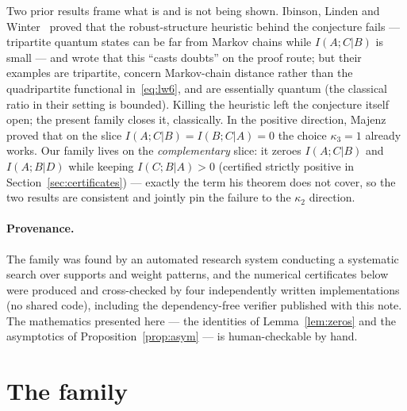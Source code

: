\documentclass[11pt]{article}
\theoremstyle{remark}
\newcommand{\I}{\mathrel{;}}
\begin{document}
Two prior results frame what is and is not being shown. Ibinson, Linden and
Winter~\cite{ILW2008} proved that the robust-structure heuristic behind the conjecture
fails --- tripartite quantum states can be far from Markov chains while $I(A\I C|B)$ is
small --- and wrote that this ``casts doubts'' on the proof route; but their examples are
tripartite, concern Markov-chain distance rather than the quadripartite functional
in~\eqref{eq:lw6}, and are essentially quantum (the classical ratio in their setting is
bounded). Killing the heuristic left the conjecture itself open; the present family
closes it, classically. In the positive direction, Majenz~\cite[Thm.~2.9]{Majenz2018}
proved that on the slice $I(A\I C|B)=I(B\I C|A)=0$ the choice $\kappa_3=1$ already
works. Our family lives on the \emph{complementary} slice: it zeroes $I(A\I C|B)$ and
$I(A\I B|D)$ while keeping $I(C\I B|A)>0$ (certified strictly positive in
Section~\ref{sec:certificates}) --- exactly the term his theorem does not cover, so the
two results are consistent and jointly pin the failure to the $\kappa_2$ direction.

\paragraph{Provenance.} The family was found by an automated research system conducting a
systematic search over supports and weight patterns, and the numerical certificates below
were produced and cross-checked by four independently written implementations (no shared
code), including the dependency-free verifier published with this note. The mathematics
presented here --- the identities of Lemma~\ref{lem:zeros} and the asymptotics of
Proposition~\ref{prop:asym} --- is human-checkable by hand.

\section{The family}
\end{document}
